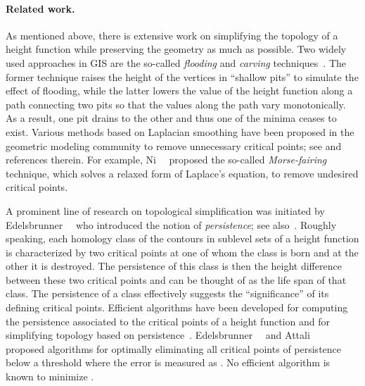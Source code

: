 \documentclass[11pt]{article}
\begin{document}
\paragraph{Related work.}
As mentioned above, there is extensive work on simplifying the topology
of a height function while preserving the geometry as much as possible.
Two widely used approaches in GIS are the so-called \emph{flooding} and
\emph{carving} techniques~\cite{Agarwal:06,Danner:07,Soille:04a,Soille:04}. 
The former technique raises the height of 
the vertices in ``shallow pits'' to simulate the effect of flooding,
while the latter lowers the value of the height function along a 
path connecting two pits so that the values along the path 
vary monotonically. As a result, one pit drains to the other and 
thus one of the minima ceases to exist. 
Various methods based on Laplacian smoothing have been proposed in the 
geometric modeling community to remove unnecessary critical 
points; see \cite{Bajaj:98,Bremer:03,Guskov:01,Ni:04} and references therein.
For example, Ni~\etal~\cite{Ni:04} proposed
the so-called \emph{Morse-fairing} technique, which solves a 
relaxed form of Laplace's equation, to remove undesired 
critical points.

A prominent line of research on topological simplification was 
initiated by Edelsbrunner~\etal~\cite{Edelsbrunner:00,Edelsbrunner:03} who introduced the 
notion of \emph{persistence}; see also~\cite{Edelsbrunner:07,Zomorodian:05,Zomorodian:09}. 
Roughly speaking,  each homology class of the 
contours in sublevel sets of a height function is characterized by 
two critical points at one of whom the class is born and at the other it is destroyed. The persistence of this class is then the height difference between these two critical points and can be thought of as the life span of 
that class. The persistence of a class effectively suggests the ``significance'' of its defining critical points. 
Efficient algorithms have been developed for computing the persistence
associated to the critical points of a height function and for simplifying topology based on 
persistence~\cite{Edelsbrunner:03,Bremer:03}.
Edelsbrunner~\etal~\cite{Edelsbrunner:06} and Attali~\etal~\cite{Attali:08} proposed algorithms 
for optimally eliminating all critical points of persistence below a 
threshold where the error is measured as 
. No efficient 
algorithm is known to minimize .
\end{document}
